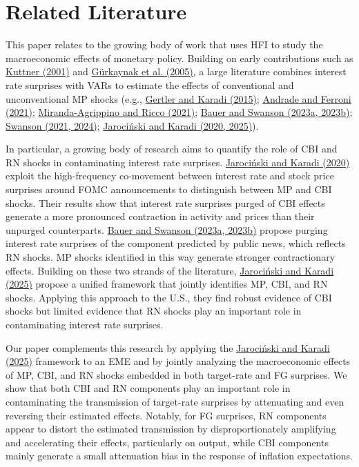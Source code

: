 \documentclass[\latexroot/\projectname]{subfiles}
\begin{document}
\section{Related Literature}
\hypertarget{Section 2}{}

This paper relates to the growing body of work that uses HFI to study the macroeconomic effects of monetary policy. Building on early contributions such as \hyperlink{Kuttner (2001)}{Kuttner (2001)} and \hyperlink{Gürkaynak et al. (2005)}{Gürkaynak et al. (2005)}, a large literature combines interest rate surprises with VARs  to estimate the effects of conventional and unconventional MP shocks (e.g., \hyperlink{Gertler and Karadi (2015)}{Gertler and Karadi (2015)};  \hyperlink{Andrade and Ferroni (2021)}{Andrade and Ferroni (2021)}; \hyperlink{Miranda-Agrippino and Ricco (2021)}{Miranda-Agrippino and Ricco (2021)}; \hyperlink{Bauer and Swanson (2023a, 2023b)}{Bauer and Swanson (2023a, 2023b)}; \hyperlink{Swanson (2021, 2024)}{Swanson (2021, 2024)}; \hyperlink{Jarociński and Karadi (2020, 2025)}{Jarociński and Karadi (2020, 2025)}).

In particular, a growing body of research aims to quantify the role of CBI and RN shocks in contaminating interest rate surprises. \hyperlink{Jarociński and Karadi (2020)}{Jarociński and Karadi (2020)} exploit the high-frequency co-movement between interest rate and stock price surprises around FOMC announcements to distinguish between MP and CBI shocks. Their results show that interest rate surprises purged of CBI effects generate a more pronounced contraction in activity and prices than their unpurged counterparts. \hyperlink{Bauer and Swanson (2023a, 2023b)}{Bauer and Swanson (2023a, 2023b)} propose purging interest rate surprises of the component predicted by public news, which reflects RN shocks. MP shocks identified in this way generate stronger contractionary effects. Building on these two strands of the literature, \hyperlink{Jarociński and Karadi (2025)}{Jarociński and Karadi (2025)} propose a unified framework that jointly identifies MP, CBI, and RN shocks. Applying this approach to the U.S., they find robust evidence of CBI shocks but limited evidence that RN shocks play an important role in contaminating interest rate surprises. 

Our paper complements this research by applying the \hyperlink{Jarociński and Karadi (2025)}{Jarociński and Karadi (2025)} framework to an EME and by jointly analyzing the macroeconomic effects of MP, CBI, and RN shocks embedded in both target-rate and FG surprises. We show that both CBI and RN components play an important role in contaminating the transmission of target-rate surprises by attenuating and even reversing their estimated effects. Notably, for FG surprises, RN components appear to distort the estimated transmission by disproportionately amplifying and accelerating their effects, particularly on output, while CBI components mainly generate a small attenuation bias in the response of inflation expectations.
\end{document}
